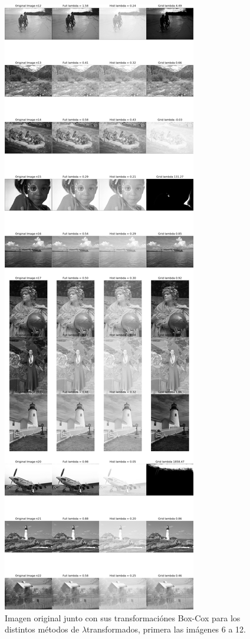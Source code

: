 \begin{figure}
    \centering
    \includegraphics[width=\textwidth]{figuras/img_BCI_all_2.png}
    \caption{Imagen original junto con sus transformaci\'ones Box-Cox para los distintos m\'etodos de $\lambda$transformados, primera las im\'agenes 6 a 12.}
\end{figure}



